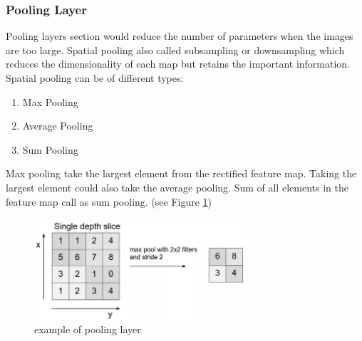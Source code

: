 \subsubsection{Pooling Layer}
Pooling layers section would reduce the number of parameters when the images are too large. Spatial pooling also called subsampling or downsampling which reduces the dimensionality of each map but retains the important information. Spatial pooling can be of different types:
\begin{enumerate}[noitemsep]
	\item Max Pooling
	\item Average Pooling
	\item Sum Pooling
\end{enumerate}
Max pooling take the largest element from the rectified feature map. Taking the largest element could also take the average pooling. Sum of all elements in the feature map call as sum pooling. (see Figure \ref{pooling})
\begin{figure}[H]
	\centering
	\includegraphics[width=0.7\textwidth]{pooling_layer.jpg}
	\caption{example of pooling layer}
	\label{pooling}
\end{figure}

